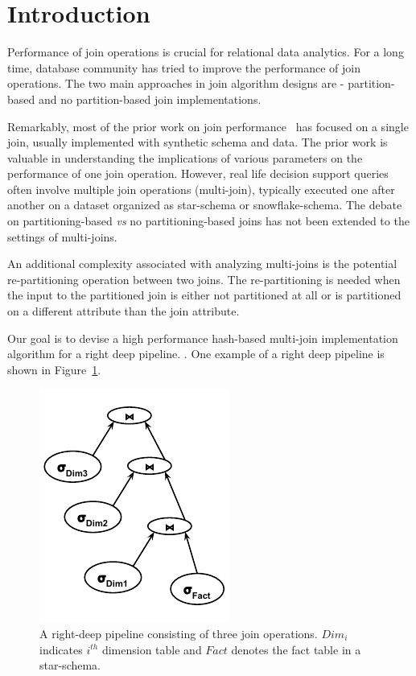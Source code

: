 \section{Introduction}
Performance of join operations is crucial for relational data analytics. 
For a long time, database community has tried to improve the performance of join operations. 
The two main approaches in join algorithm designs are - partition-based and no partition-based join implementations. 

Remarkably, most of the prior work on join performance~\cite{DBLP:conf/sigmod/BlanasLP11,DBLP:conf/sigmod/SchuhCD16} has focused on a single join, usually implemented with synthetic schema and data. 
The prior work is valuable in understanding the implications of various parameters on the performance of one join operation. 
However, real life decision support queries often involve multiple join operations (multi-join), typically executed one after another on a dataset organized as star-schema or snowflake-schema. 
The debate on partitioning-based \textit{vs} no partitioning-based joins has not been extended to the settings of multi-joins. 

An additional complexity associated with analyzing multi-joins is the potential re-partitioning operation between two joins. 
The re-partitioning is needed when the input to the partitioned join is either not partitioned at all or is partitioned on a different attribute than the join attribute.

Our goal is to devise a high performance hash-based multi-join implementation algorithm for a right deep pipeline.
.
One example of a right deep pipeline is shown in Figure~\ref{fig:right-deep-pipeline}.

\begin{figure}[t]
	\centering
	\includegraphics[]{figures/right-deep-pipeline.pdf}
	\caption{A right-deep pipeline consisting of three join operations. $Dim_i$ indicates $i^{th}$ dimension table and $Fact$ denotes the fact table in a star-schema.}
	\label{fig:right-deep-pipeline}
\end{figure}

